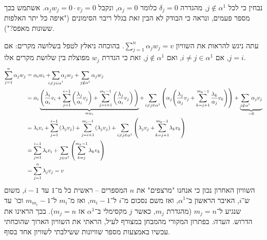 \documentclass[]{article}
\newcommand\co        {\colon}
\newcommand\ag        {\alpha}
\newcommand\dg        {\delta}
\renewcommand\lg      {\lambda}
\newcommand\cl [1]    {\left ( #1 \right )}
\theoremstyle{definition}
\begin{document}
	נבחין כי לכל $j \notin \ag^1$, מהגדרה $\dg_j = 0$ כלומר $\ag_j = 0$, ונקבל $\ag_jw_j = 0 \cdot v_j = 0$. אשתמש בכך מספר פעמים, ונראה כי הבודק לא הבין זאת בגלל ריבוי הסימונים ("איפה כל יתר האלפות ששונות מאפס?"). 
	
	עתה ניגש להראות את השוויון $\sum_{j = 1}^{n} \ag_jw_j = v$. בהוכחה ניאלץ לטפל בשלושה מקרים: אם $j = i$, אם $i \neq j \in \ag^1$, ואם $j \notin \ag^1$, זאת כי הגדרת $w_j$ מפוצלת בין שלושת מקרים אלו. 
	\begin{align*}
		\sum_{j = 1}^{n}\ag_j w_j &= \ag_i w_i + \sum_{\mathclap{i \neq j \in \ag^1}}\ag_j w_j + \sum_{j \notin \ag^1}\ag_jw_j \\
		&= \ag_i \underbrace{\Bigg (\frac{\lg_i}{\ag_i}v_i + \sum_{j = 1}^{i - 1}\cl{\frac{\lg_j}{\ag_i} v_j} + \sum_{j = i + 1}^{m_i - 1}\cl{\frac{\lg_j}{\ag_i}v_j} \Bigg )}_{= w_i}
		+ \sum_{i \neq j \in \ag^1}\cl{\ag_j \Bigg({\frac{\lg_j}{\ag_j}v_j + \sum_{k = j + 1}^{m_k - 1}\frac{\lg_k}{\ag_j}v_k}\Bigg) } + \underbrace{\sum_{j \notin \ag^1}\ag_j v_j}_{=0} \\
		&= \lg_i v_i + \sum_{j = 1}^{i - 1}\cl{\lg_j v_j} + \sum_{j = i + 1}^{m_i - 1}\cl{\lg_j v_j} + \sum_{i \neq j \in \ag^1}\cl{\lg_j v_j + \sum_{\mathclap{k = j + 1}}^{m_k - 1} \lg_k v_k} \\
		&= \sum_{j = 1}^{i - 1}\lg_i v_i + \sum_{j \in \ag^1} \cl{\sum_{k = j}^{m_k - 1} \lg_k v_k} \\
		&= \sum_{j = 1}^{n}\lg_jv_j = v
	\end{align*}
	השוויון האחרון נכון כי אנחנו "מרצפים" את $n$ המספרים – ראשית כל מ־$1$ עד $i - 1$, משום ש־$i$, האיבר הראשון ב־$\ag^1$, ואז משם נסכום מ־$i$ ל־$m_i - 1$, ואז מ־$m_i$ ל־$m_{m_i} - 1$ וכו' עד שנגיע ל־$m_j = n$ (מהגדרת $m_j$, כאשר $j$ מקסימלי ב־$\ag^1$ אז $m_j = n$). בכך הראינו את הדרוש. 
	\textit{הערה: }בפתרון המקורי מהמבחן במצורף לעיל, הראתי את השוויון הארוך שהוכחתי עכשיו באמצעות מספר שוויונות ששילבתי לשוויון אחד בסוף. 
	
\end{document}
